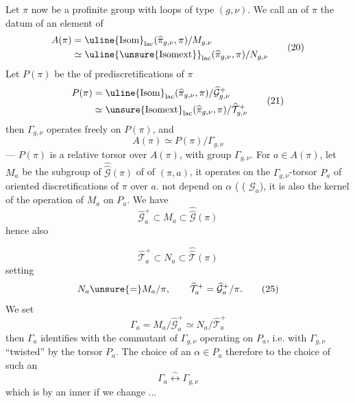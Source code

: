 Let $\pi$ now be a profinite group with loops of type $(g,\nu)$. We call an \uline{} of $\pi$ the datum of an element of
\[
\begin{aligned}
 A(\pi)&=\uline{\mathrm{Isom}}_{\mathrm{lac}}(\widehat{\pi}_{g,\nu},\pi)/M_{g,\nu}\\
 &\simeq\uline{\unsure{\mathrm{Isomext}}}_{\mathrm{lac}}(\widehat{\pi}_{g,\nu},\pi)/N_{g,\nu}
\end{aligned}
\tag{20}
\]
Let $P(\pi)$ be the  of prediscretifications  of $\pi$
\[
\begin{aligned}
 P(\pi)&=\uline{\mathrm{Isom}}_{\mathrm{lac}}(\widehat{\pi}_{g,\nu},\pi)/\widehat{\mathcal G}_{g,\nu}^{+}\\
 &\simeq\unsure{\mathrm{Isomext}}_{\mathrm{lac}}(\widehat{\pi}_{g,\nu},\pi)/\widehat{\mathcal T}_{g,\nu}^{+}
\end{aligned}
\tag{21}
\]
then $\Gamma_{g,\nu}$ operates freely  on $P(\pi)$, and
\[
 A(\pi)\simeq P(\pi)/\Gamma_{g,\nu}
\tag{22}
\]
--- $P(\pi)$ is a relative torsor over $A(\pi)$, with group $\Gamma_{g,\nu}$. For $a\in A(\pi)$, let $M_a$ be the subgroup of $\widehat{\widehat{\mathcal G}}(\pi)$ of  of $(\pi,a)$, it operates on the $\Gamma_{g,\nu}$-torsor $P_a$ of oriented discretifications of $\pi$ over $a$.
 not depend on $\alpha$ ( ( $\widehat{\mathcal G}_a$), it is also the kernel of the operation of $M_a$ on $P_a$. We have
\[
 \widehat{\mathcal G}_a^{+}\subset M_a\subset\widehat{\widehat{\mathcal G}}(\pi)
\tag{23}
\]
hence also


\[
 \widehat{\mathcal T}_a^{+}\subset N_a\subset\widehat{\widehat{\mathcal T}}(\pi)
\tag{24}
\]
setting
\[
 N_a\unsure{=}M_a/\pi,\qquad
 \widehat{\mathcal T}_a^{+}=\widehat{\mathcal G}_a^{+}/\pi.
\tag{25}
\]
We set
\[
 \Gamma_a=M_a/\widehat{\mathcal G}_a^{+}\simeq N_a/\widehat{\mathcal T}_a^{+}
\tag{26}
\]
then $\Gamma_a$ identifies with the commutant of $\Gamma_{g,\nu}$ operating on $P_a$, i.e. with $\Gamma_{g,\nu}$ ``twisted'' by the torsor $P_a$. The choice of an $\alpha\in P_a$  therefore to the choice of such an 
\[
 \Gamma_a\overset{\sim}{\longleftrightarrow}\Gamma_{g,\nu}
\tag{27}
\]
which is  by an inner  if we change \unsure{$\alpha$|$\alpha$}...

